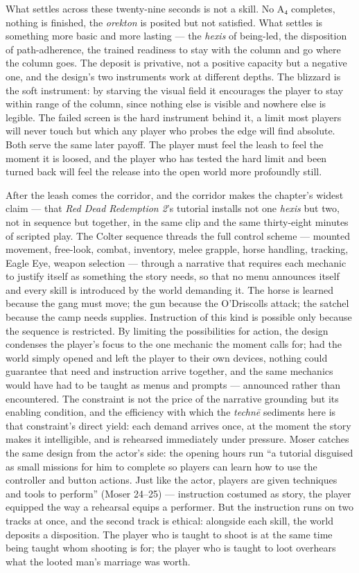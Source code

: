 \documentclass{article}
\begin{document}
What settles across these twenty-nine seconds is not a skill. No A₄ completes, nothing is finished, the \textit{orekton} is posited but not satisfied. What settles is something more basic and more lasting — the \textit{hexis} of being-led, the disposition of path-adherence, the trained readiness to stay with the column and go where the column goes. The deposit is privative, not a positive capacity but a negative one, and the design's two instruments work at different depths. The blizzard is the soft instrument: by starving the visual field it encourages the player to stay within range of the column, since nothing else is visible and nowhere else is legible. The failed screen is the hard instrument behind it, a limit most players will never touch but which any player who probes the edge will find absolute. Both serve the same later payoff. The player must feel the leash to feel the moment it is loosed, and the player who has tested the hard limit and been turned back will feel the release into the open world more profoundly still.

After the leash comes the corridor, and the corridor makes the chapter's widest claim — that \textit{Red Dead Redemption 2}'s tutorial installs not one \textit{hexis} but two, not in sequence but together, in the same clip and the same thirty-eight minutes of scripted play. The Colter sequence threads the full control scheme — mounted movement, free-look, combat, inventory, melee grapple, horse handling, tracking, Eagle Eye, weapon selection — through a narrative that requires each mechanic to justify itself as something the story needs, so that no menu announces itself and every skill is introduced by the world demanding it. The horse is learned because the gang must move; the gun because the O'Driscolls attack; the satchel because the camp needs supplies. Instruction of this kind is possible only because the sequence is restricted. By limiting the possibilities for action, the design condenses the player's focus to the one mechanic the moment calls for; had the world simply opened and left the player to their own devices, nothing could guarantee that need and instruction arrive together, and the same mechanics would have had to be taught as menus and prompts — announced rather than encountered. The constraint is not the price of the narrative grounding but its enabling condition, and the efficiency with which the \textit{technē} sediments here is that constraint's direct yield: each demand arrives once, at the moment the story makes it intelligible, and is rehearsed immediately under pressure.
Moser catches the same design from the actor's side: the opening hours run ``a tutorial disguised as small missions for him to complete so players can learn how to use the controller and button actions. Just like the actor, players are given techniques and tools to perform'' (Moser 24--25) — instruction costumed as story, the player equipped the way a rehearsal equips a performer. But the instruction runs on two tracks at once, and the second track is ethical: alongside each skill, the world deposits a disposition. The player who is taught to shoot is at the same time being taught whom shooting is for; the player who is taught to loot overhears what the looted man's marriage was worth.
\end{document}

